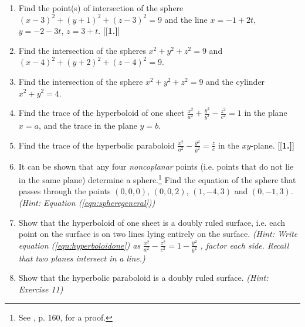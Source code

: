 \begin{enumerate}[\bfseries 1.]
 \item Find the point(s) of intersection of the sphere $(x - 3)^2 + (y + 1)^2 + (z - 3)^2 = 9$ and the line
  $x = -1 + 2t$, $y = -2 - 3t$, $z = 3 + t$.
\vspace{1mm}
[{[\bfseries 1.]}]
 \item Find the intersection of the spheres $x^2 + y^2 + z^2 = 9$ and $(x - 4)^2 + (y + 2)^2 + (z - 4)^2 = 9$.
 \item Find the intersection of the sphere $x^2 + y^2 + z^2 = 9$ and the cylinder $x^2 + y^2 = 4$.
 \item Find the trace of the hyperboloid of one sheet $\frac{x^2}{a^2} + \frac{y^2}{b^2} - \frac{z^2}{c^2} = 1$ in
  the plane $x = a$, and the trace in the plane $y = b$.
 \item Find the trace of the hyperbolic paraboloid $\frac{x^2}{a^2} - \frac{y^2}{b^2} = \frac{z}{c}$ in the $xy$-plane.
[{[\bfseries 1.]}]
 \item It can be shown that any four \emph{noncoplanar} points (i.e. points that do not lie in the same plane)
  determine a sphere.\footnote{See \cite{wk}, p. 160, for a proof.} Find the equation of the sphere that passes through
  the points $(0,0,0)$, $(0,0,2)$, $(1,-4,3)$ and $(0,-1,3)$. \emph{(Hint: Equation (\ref{eqn:spheregeneral}))}
 \item Show that the hyperboloid of one sheet is a doubly
  ruled surface, i.e. each point on the surface is on two lines lying entirely on the surface.
  \emph{(Hint: Write equation (\ref{eqn:hyperboloidone}) as } $\frac{x^2}{a^2} - \frac{z^2}{c^2} = 1 -
  \frac{y^2}{b^2}$ \emph{, factor each side. Recall that two planes intersect in a line.)}
 \item Show that the hyperbolic paraboloid is a doubly ruled surface. \emph{(Hint: Exercise 11)}

\end{enumerate}
